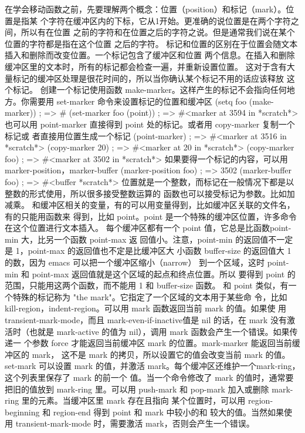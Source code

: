 \documentclass[11pt]{ctexart}
\begin{document}
{{{{在学会移动函数之前，先要理解两个概念：位置（position）和标记（mark）。位置是指某
个字符在缓冲区内的下标，它从1开始。更准确的说位置是在两个字符之间，所以有在位置
之前的字符和在位置之后的字符之说。但是通常我们说在某个位置的字符都是指在这个位置
之后的字符。
标记和位置的区别在于位置会随文本插入和删除而改变位置。一个标记包含了缓冲区和位置
两个信息。在插入和删除缓冲区里的文本时，所有的标记都会检查一遍，并重新设置位置。
这对于含有大量标记的缓冲区处理是很花时间的，所以当你确认某个标记不用的话应该释放
这个标记。
创建一个标记使用函数 make-marker。这样产生的标记不会指向任何地方。你需要用
set-marker 命令来设置标记的位置和缓冲区
(setq foo (make-marker))             ; => \#<marker in no buffer>
(set-marker foo (point))             ; => \#<marker at 3594 in *scratch*>
也可以用 point-marker 直接得到 point 处的标记。或者用 copy-marker 复制一个标记或
者直接用位置生成一个标记
(point-marker)                       ; => \#<marker at 3516 in *scratch*>
(copy-marker 20)                     ; => \#<marker at 20 in *scratch*>
(copy-marker foo)                    ; => \#<marker at 3502 in *scratch*>
如果要得一个标记的内容，可以用 marker-position，marker-buffer
(marker-position foo)                ; => 3502
(marker-buffer foo)                  ; => \#<buffer *scratch*>
位置就是一个整数，而标记在一般情况下都是以整数的形式使用，所以很多接受整数运算的
函数也可以接受标记为参数。比如加减乘。
和缓冲区相关的变量，有的可以用变量得到，比如缓冲区关联的文件名，有的只能用函数来
得到，比如 point。point 是一个特殊的缓冲区位置，许多命令在这个位置进行文本插入。
每个缓冲区都有一个 point 值，它总是比函数point-min 大，比另一个函数 point-max 返
回值小。注意，point-min 的返回值不一定是 1，point-max 的返回值也不定是比缓冲区大
小函数 buffer-size 的返回值大 1 的数，因为 emacs 可以把一个缓冲区缩小（narrow）
到一个区域，这时 point-min 和 point-max 返回值就是这个区域的起点和终点位置。所以
要得到 point 的范围，只能用这两个函数，而不能用 1 和 buffer-size 函数。
和 point 类似，有一个特殊的标记称为 "the mark"。它指定了一个区域的文本用于某些命
令，比如 kill-region，indent-region。可以用 mark 函数返回当前 mark 的值。如果使
用 transient-mark-mode，而且 mark-even-if-inactive值是 nil 的话，在 mark 没有激
活时（也就是 mark-active 的值为 nil），调用 mark 函数会产生一个错误。如果传递一
个参数 force 才能返回当前缓冲区 mark 的位置。mark-marker 能返回当前缓冲区的 mark，
这不是 mark 的拷贝，所以设置它的值会改变当前 mark 的值。set-mark 可以设置 mark
的值，并激活 mark。每个缓冲区还维护一个mark-ring，这个列表里保存了 mark 的前一个
值。当一个命令修改了 mark 的值时，通常要把旧的值放到 mark-ring 里。可以用
push-mark 和 pop-mark 加入或删除 mark-ring 里的元素。当缓冲区里 mark 存在且指向
某个位置时，可以用 region-beginning 和 region-end 得到 point 和 mark 中较小的和
较大的值。当然如果使用 transient-mark-mode 时，需要激活 mark，否则会产生一个错误。
}}}}
\end{document}
